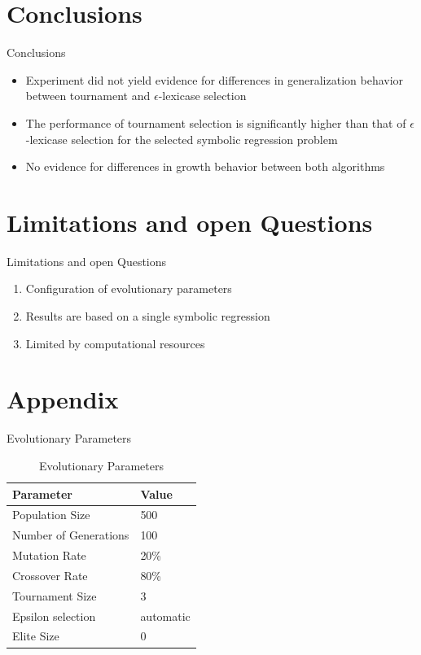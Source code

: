 \documentclass[
  ignorenonframetext,
]{beamer}
\providecommand{\tightlist}{%
  \setlength{\itemsep}{0pt}\setlength{\parskip}{0pt}}
\begin{document}
\hypertarget{conclusions}{%
\section{Conclusions}\label{conclusions}}

\begin{frame}{Conclusions}
\begin{itemize}
\tightlist
\item
  Experiment did not yield evidence for differences in generalization
  behavior between tournament and \(\epsilon\)-lexicase selection
\item
  The performance of tournament selection is significantly higher than
  that of \(\epsilon\)-lexicase selection for the selected symbolic
  regression problem
\item
  No evidence for differences in growth behavior between both algorithms
\end{itemize}
\end{frame}

\hypertarget{limitations-and-open-questions}{%
\section{Limitations and open
Questions}\label{limitations-and-open-questions}}

\begin{frame}{Limitations and open Questions}
\begin{enumerate}
\tightlist
\item
  Configuration of evolutionary parameters
\item
  Results are based on a single symbolic regression
\item
  Limited by computational resources
\end{enumerate}
\end{frame}

\hypertarget{appendix}{%
\section{Appendix}\label{appendix}}

\begin{frame}{Evolutionary Parameters}
\protect\hypertarget{evolutionary-parameters}{}
\begin{table}

\caption{\label{tab:unnamed-chunk-3}Evolutionary Parameters}
\centering
\begin{tabular}[t]{l|l}
\hline
Parameter & Value\\
\hline
Population Size & 500\\
\hline
Number of Generations & 100\\
\hline
Mutation Rate & 20\%\\
\hline
Crossover Rate & 80\%\\
\hline
Tournament Size & 3\\
\hline
Epsilon selection & automatic\\
\hline
Elite Size & 0\\
\hline
\end{tabular}
\end{table}
\end{frame}
\end{document}
